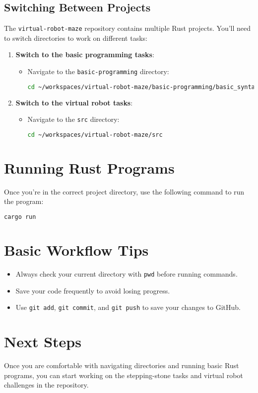 \documentclass[12pt]{article}
\begin{document}
	\subsection*{Switching Between Projects}
	The \texttt{virtual-robot-maze} repository contains multiple Rust projects. You’ll need to switch directories to work on different tasks:
	\begin{enumerate}
		\item \textbf{Switch to the basic programming tasks}:
		\begin{itemize}
			\item Navigate to the \texttt{basic-programming} directory:
			\begin{lstlisting}[language=bash]
				cd ~/workspaces/virtual-robot-maze/basic-programming/basic_syntax
			\end{lstlisting}
		\end{itemize}
		
		\item \textbf{Switch to the virtual robot tasks}:
		\begin{itemize}
			\item Navigate to the \texttt{src} directory:
			\begin{lstlisting}[language=bash]
				cd ~/workspaces/virtual-robot-maze/src
			\end{lstlisting}
		\end{itemize}
	\end{enumerate}
	
	\section*{Running Rust Programs}
	Once you’re in the correct project directory, use the following command to run the program:
	\begin{lstlisting}[language=bash]
		cargo run
	\end{lstlisting}
	
	\section*{Basic Workflow Tips}
	\begin{itemize}
		\item Always check your current directory with \texttt{pwd} before running commands.
		\item Save your code frequently to avoid losing progress.
		\item Use \texttt{git add}, \texttt{git commit}, and \texttt{git push} to save your changes to GitHub.
	\end{itemize}
	
	\section*{Next Steps}
	Once you are comfortable with navigating directories and running basic Rust programs, you can start working on the stepping-stone tasks and virtual robot challenges in the repository.
	
\end{document}
